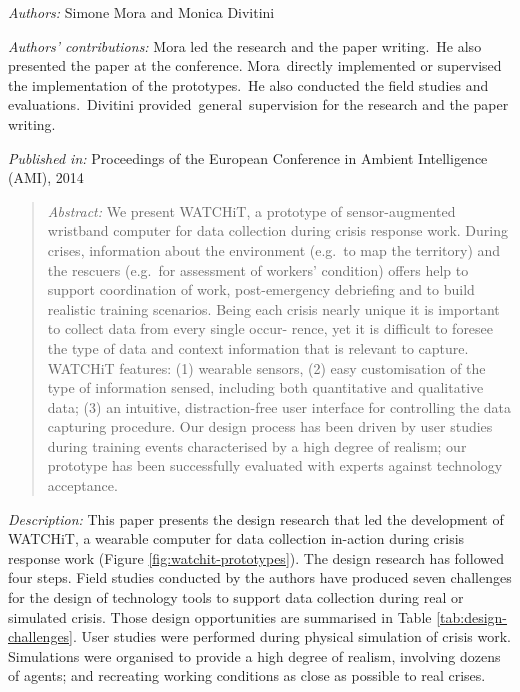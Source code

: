 \emph{Authors:} Simone Mora and Monica Divitini

\emph{Authors' contributions:} Mora led the research and the paper writing.~He also presented the paper at the conference. Mora~directly implemented or supervised the implementation of the prototypes.~He also conducted the field studies and evaluations.~Divitini provided~general~supervision for the research and the paper writing.

\emph{Published in:} Proceedings of the European Conference in Ambient Intelligence (AMI), 2014
\begin{quote}
	\emph{Abstract:} We present WATCHiT, a prototype of sensor-augmented wristband computer for data collection during crisis response work. During crises, information about the environment (e.g.~to map the territory) and the rescuers (e.g.~for assessment of workers' condition) offers help to support coordination of work, post-emergency debriefing and to build realistic training scenarios. Being each crisis nearly unique it is important to collect data from every single occur- rence, yet it is difficult to foresee the type of data and context information that is relevant to capture. WATCHiT features: (1) wearable sensors, (2) easy customisation of the type of information sensed, including both quantitative and qualitative data; (3) an intuitive, distraction-free user interface for controlling the data capturing procedure. Our design process has been driven by user studies during training events characterised by a high degree of realism; our prototype has been successfully evaluated with experts against technology acceptance. 
\end{quote}

\emph{Description:} This paper presents the design research that led the development of WATCHiT, a wearable computer for data collection in-action during crisis response work (Figure \ref{fig:watchit-prototypes}). The design research has followed four steps. Field studies conducted by the authors have produced seven challenges for the design of technology tools to support data collection during real or simulated crisis. Those design opportunities are summarised in Table \ref{tab:design-challenges}. User studies were performed during physical simulation of crisis work. Simulations were organised to provide a high degree of realism, involving dozens of agents; and recreating working conditions as close as possible to real crises.

